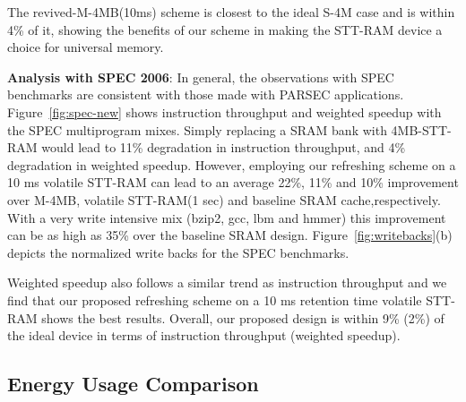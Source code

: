 The revived-M-4MB(10ms) scheme is closest to the ideal S-4M case and is within 4\% of it, showing the benefits of our scheme in making the STT-RAM device a choice for universal memory.

\begin{figure*} [t]
\centering
 \caption{\label{fig:spec-new} \scriptsize \bf Normalized Average Instruction Throughput(IT) and Weighted Speedup(WS) for SPEC 2006 multiprogrammed mixes. }
\end{figure*}

{\bf Analysis with SPEC 2006}: In general, the observations with SPEC benchmarks are consistent with those made with PARSEC applications. Figure~\ref{fig:spec-new} shows instruction throughput and weighted speedup with the  SPEC multiprogram
mixes. Simply replacing a SRAM bank with 4MB-STT-RAM would lead to 11\% degradation in instruction throughput, and 4\% degradation in weighted speedup. However, employing our refreshing scheme on a 10 ms volatile STT-RAM can lead to an average 22\%, 11\%  and 10\% improvement over M-4MB, volatile STT-RAM(1 sec) and baseline SRAM cache,respectively. With a very write intensive mix (bzip2, gcc, lbm and hmmer) this improvement can be as high as 35\% over the baseline SRAM design. Figure~\ref{fig:writebacks}(b) depicts the normalized write backs for
the SPEC benchmarks.


Weighted speedup also follows a similar trend as instruction throughput and we find that our proposed refreshing scheme on a 10 ms retention time volatile STT-RAM shows the best results. Overall, our proposed design is within 9\% (2\%) of the ideal device in terms of instruction throughput (weighted speedup).

\subsection{Energy Usage Comparison}

